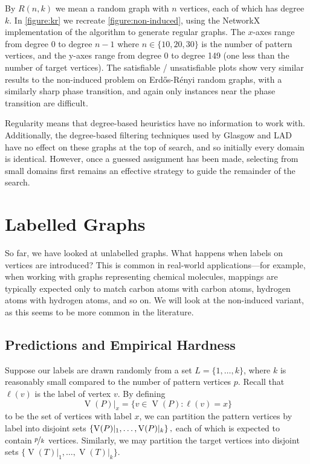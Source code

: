 \documentclass[twoside,11pt]{article}
\begin{document}
By $R(n, k)$ we mean a random graph with $n$ vertices, each of which has degree $k$. In
\cref{figure:kr} we recreate \cref{figure:non-induced}, using the NetworkX implementation
\cite{o:NetworkX} of the  algorithm to generate regular graphs.
The $x$-axes range from degree 0 to degree $n - 1$ where $n \in \{ 10, 20, 30 \}$ is the number of
pattern vertices, and the y-axes range from degree 0 to degree
149 (one less than the number of target vertices).  The satisfiable / unsatisfiable plots show very
similar results to the non-induced problem on Erd\H{o}s-R\'enyi random graphs, with a similarly
sharp phase transition, and again only instances near the phase transition are difficult.

Regularity means that degree-based heuristics have no information to work with. Additionally, the
degree-based filtering techniques used by Glasgow and LAD have no effect on these graphs at the top
of search, and so initially every domain is identical. However, once a guessed assignment has been
made, selecting from small domains first remains an effective strategy to guide the remainder of the
search.

\section{Labelled Graphs}\label{section:labelled}

So far, we have looked at unlabelled graphs. What happens when labels on vertices are introduced?
This is common in real-world applications---for example, when working with graphs representing
chemical molecules, mappings are typically expected only to match carbon atoms with carbon atoms,
hydrogen atoms with hydrogen atoms, and so on.  We will look at the non-induced variant, as this
seems to be more common in the literature.

\subsection{Predictions and Empirical Hardness}

Suppose our labels are drawn randomly from a set $L = \{ 1, \ldots, k \}$, where $k$ is reasonably
small compared to the number of pattern vertices $p$. Recall that $\ell(v)$ is the label of vertex
$v$. By defining \[ \operatorname{V}(P)\vert_x = \{ v \in \operatorname{V}(P) : \ell(v) = x \} \] to
be the set of vertices with label $x$, we can partition the pattern vertices by label into disjoint
sets $\{\operatorname{V}(P)\vert_1, \ldots, \operatorname{V}(P)\vert_k \}\textnormal{\,,}$ each of
which is expected to contain $\nicefrac{p}{k}$ vertices. Similarly, we may partition the target
vertices into disjoint sets $\{ \operatorname{V}(T)\vert_1, \ldots, \operatorname{V}(T)\vert_k \}$.
\end{document}
